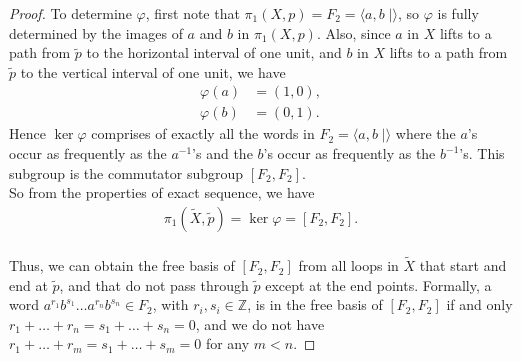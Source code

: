 \documentclass{article}
\begin{document}
\begin{enumerate}[label={\bf Q\arabic*:}]
\begin{proof}
      To determine $\varphi$, first note that $\pi_1(X,p)=F_2=\langle
      a,b\;|\rangle$, so $\varphi$ is fully determined by the images of $a$
      and $b$ in $\pi_1(X,p)$. Also, since $a$ in $X$ lifts to a path from
      $\widetilde{p}$ to the horizontal interval of one unit, and $b$ in
      $X$ lifts to a path from $\widetilde{p}$ to the vertical interval of
      one unit, we have
      \begin{align*}
        \varphi(a)  &=(1,0), \\
        \varphi(b)  &=(0,1).
      \end{align*}
      Hence $\ker\varphi$ comprises of exactly all the words in
      $F_2=\langle a,b\;|\rangle$ where the $a$'s occur as frequently as
      the $a^{-1}$'s and the $b$'s occur as frequently as the $b^{-1}$'s.
      This subgroup is the commutator subgroup $[F_2,F_2]$. \\

      So from the properties of exact sequence, we have
      \begin{align*}
        \pi_1(\widetilde{X},\widetilde{p})=\ker\varphi = [F_2,F_2]. \\
      \end{align*}

      Thus, we can obtain the free basis of $[F_2,F_2]$ from all loops in
      $\widetilde{X}$ that start and end at $\widetilde{p}$, and that do
      not pass through $\widetilde{p}$ except at the end points. Formally,
      a word $a^{r_1}b^{s_1}\ldots a^{r_n}b^{s_n}\in F_2$, with
      $r_i,s_i\in\mathbb{Z}$, is in the free basis of $[F_2,F_2]$ if
      and only $r_1+\ldots+r_n=s_1+\ldots+s_n=0$, and we do not have
      $r_1+\ldots+r_m=s_1+\ldots+s_m=0$ for any $m<n$.
    \end{proof}
\end{enumerate}
\end{document}
